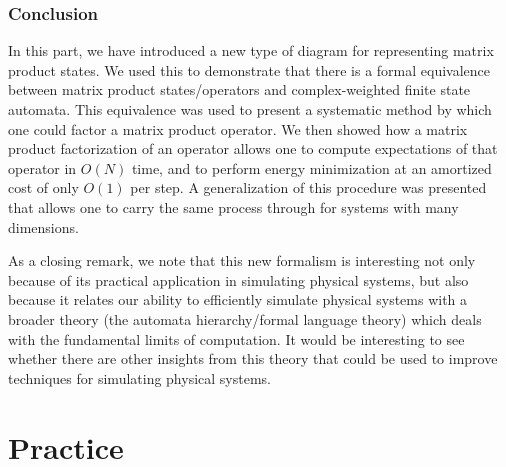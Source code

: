 \documentclass{amsbook}
\theoremstyle{plain}
\theoremstyle{definition}
\theoremstyle{remark}
\begin{document}
\subsection{Conclusion}

In this part, we have introduced a new type of diagram for representing matrix product states.  We used this to demonstrate that there is a formal equivalence between matrix product states/operators and complex-weighted finite state automata.  This equivalence was used to present a systematic method by which one could factor a matrix product operator.  We then showed how a matrix product factorization of an operator allows one to compute expectations of that operator in $O(N)$ time, and to perform energy minimization at an amortized cost of only $O(1)$ per step.  A generalization of this procedure was presented that allows one to carry the same process through for systems with many dimensions.

As a closing remark, we note that this new formalism is interesting not only because of its practical application in simulating physical systems, but also because it relates our ability to efficiently simulate physical systems with a broader theory (the automata hierarchy/formal language theory) which deals with the fundamental limits of computation.  It would be interesting to see whether there are other insights from this theory that could be used to improve techniques for simulating physical systems.
\chapter{Practice}


\end{document}
